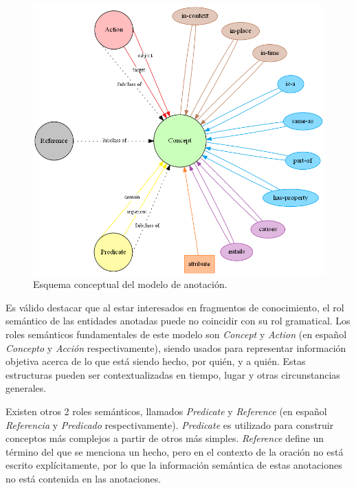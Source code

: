 \begin{figure}[h!]
	\includegraphics[width=\linewidth]{graphics/annotation_model.png}
	\caption[Esquema conceptual del modelo de anotación]{Esquema conceptual del modelo de anotación.}
	\label{fig:annotation_model}
\end{figure}

Es válido destacar que al estar interesados en fragmentos de conocimiento, el rol semántico de las entidades anotadas puede no coincidir con su rol gramatical. Los roles semánticos fundamentales de este modelo son {\it Concept} y {\it Action} (en español {\it Concepto} y {\it Acción} respectivamente), siendo usados para representar información objetiva acerca de lo que está siendo hecho, por quién, y a quién. Estas estructuras pueden ser contextualizadas en tiempo, lugar y otras circunstancias generales.

Existen otros 2 roles semánticos, llamados {\it Predicate} y {\it Reference} (en español {\it Referencia} y {\it Predicado} respectivamente). {\it Predicate} es utilizado para construir conceptos más complejos a partir de otros más simples. {\it Reference} define un término del que se menciona un hecho, pero en el contexto de la oración no está escrito explícitamente, por lo que la información semántica de estas anotaciones no está contenida en las anotaciones.

